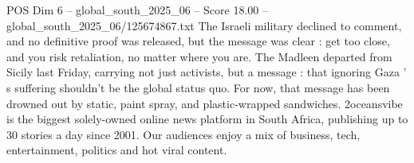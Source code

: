 \begin{textsample}{POS Dim 6 – global\_south\_2025\_06 – Score 18.00 – global\_south\_2025\_06/125674867.txt}
The Israeli military declined to comment, and no definitive proof was released, but the message was clear : get too close, and you risk retaliation, no matter where you are.
The Madleen departed from Sicily last Friday, carrying not just activists, but a message : that ignoring Gaza ' s suffering shouldn't be the global status quo.
For now, that message has been drowned out by static, paint spray, and plastic-wrapped sandwiches. 2oceansvibe is the biggest solely-owned online news platform in South Africa, publishing up to 30 stories a day since 2001.
Our audiences enjoy a mix of business, tech, entertainment, politics and hot viral content.

\end{textsample}
